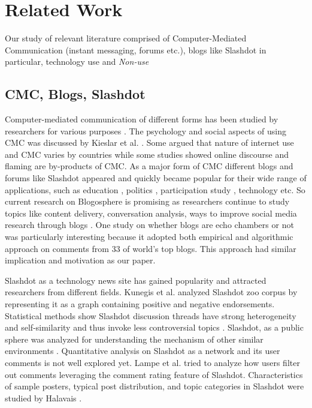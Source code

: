 \section{Related Work}
\label{sec:relatedwork}
Our study of relevant literature comprised of Computer-Mediated Communication (instant messaging, forums etc.), blogs like Slashdot in particular, technology use and \emph{Non-use} 

\subsection{CMC, Blogs, Slashdot}
Computer-mediated communication of different forms has been studied by researchers for various purposes \cite{ackerman1996answer}. The psychology and social aspects of using CMC was discussed by Kieslar et al. \cite{kiesler1984social}. Some argued that nature of internet use and CMC varies by countries \cite{wellman2003social} while some studies \cite{lange2006your} showed online discourse and flaming are by-products of CMC. As a major form of CMC different blogs and forums like Slashdot appeared and quickly became popular for their wide range of applications, such as education \cite{duffy2006use, pinkman2005using,  williams2004exploring}, politics \cite{davis2009typing, koop2009political}, participation study \cite{gaonkar2008micro}, technology \cite{khabiri2009analyzing} etc. So current research on Blogosphere is promising as researchers continue to study topics like content delivery, conversation analysis, ways to improve social media research through blogs \cite{ferdig2004content, herring2005conversations, hookway2008entering}. One study \cite{gilbert2009blogs} on whether blogs are echo chambers or not was particularly interesting because it adopted both empirical and algorithmic approach on comments from 33 of world's top blogs. This approach had similar implication and motivation as our paper.

Slashdot as a technology news site has gained popularity and attracted researchers from different fields. Kunegis et al. \cite{kunegis2009slashdot} analyzed Slashdot zoo corpus by representing it as a graph containing positive and negative endorsements. Statistical methods show Slashdot discussion threads have strong heterogeneity and self-similarity and thus invoke less controversial topics \cite{gomez2008statistical}. Slashdot, as a public sphere was analyzed for understanding the mechanism of other similar environments \cite{baoill2000slashdot, poor2005mechanisms}. Quantitative analysis on Slashdot as a network and its user comments \cite{gomez2008statistical, kaltenbrunner2007description} is not well explored yet. Lampe et al. \cite{lampe2007follow} tried to analyze how users filter out comments leveraging the comment rating feature of Slashdot. Characteristics of sample posters, typical post distribution, and topic categories in Slashdot were studied by Halavais \cite{halavais2001slashdot}.



